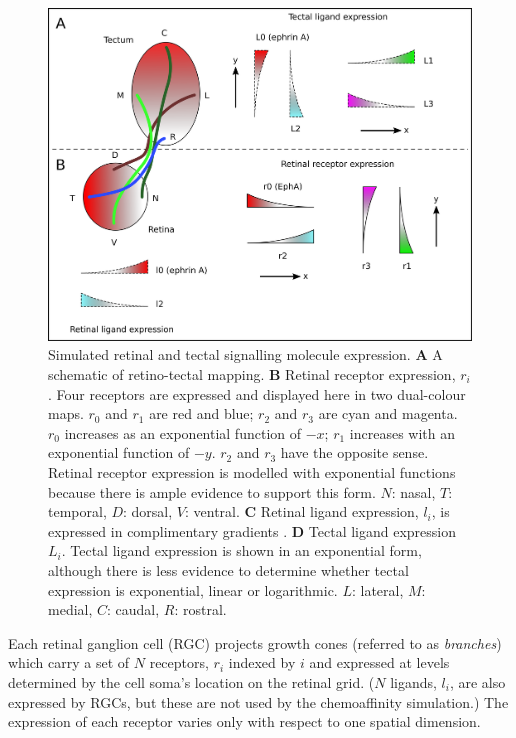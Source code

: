 \documentclass[11pt, a4paper]{article}
\begin{document}
\begin{figure}
\includegraphics[width=\linewidth]{./images/expressions_fig.png}
\caption{Simulated retinal and tectal signalling molecule
expression. \textbf{A} A schematic of retino-tectal mapping.
%
\textbf{B} Retinal receptor expression, $r_i$. Four receptors are expressed and
displayed here in two dual-colour maps. $r_0$ and $r_1$ are red and blue;
$r_2$ and $r_3$ are cyan and magenta. $r_0$ increases as an exponential
function of $-x$; $r_1$ increases with an exponential function of $-y$. $r_2$
and $r_3$ have the opposite sense. Retinal receptor expression is modelled
with exponential functions because there is ample evidence to support this
form. $N$: nasal, $T$: temporal, $D$: dorsal, $V$: ventral.
%
\textbf{C} Retinal ligand expression, $l_i$, is expressed in complimentary
gradients \citep{hornberger_modulation_1999}.
%
\textbf{D} Tectal ligand expression $L_i$. Tectal ligand expression is shown
in an exponential form,
although there is less evidence to determine whether tectal expression is
exponential, linear or logarithmic.
$L$: lateral, $M$: medial, $C$: caudal, $R$: rostral.
}
\label{f:ex}
\end{figure}

Each retinal ganglion cell (RGC) projects growth cones (referred to
as \emph{branches}) which carry a set of $N$ receptors, $r_i$ indexed by $i$ and
expressed at levels determined by the cell soma's location on the
retinal grid. ($N$ ligands, $l_i$, are also expressed by RGCs, but these are not
used by the chemoaffinity simulation.) The expression of each receptor
varies only with respect to one spatial dimension.
\end{document}
